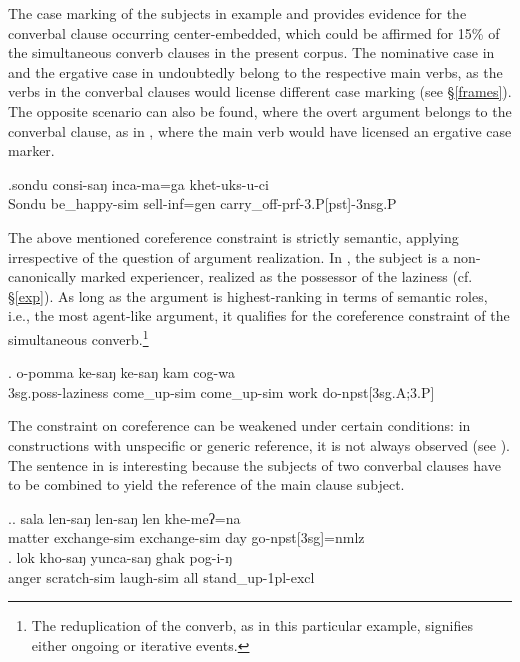 The case marking of the subjects in example \Last[a] and \Last[c] provides evidence for the converbal clause occurring center-embedded, which could be affirmed for 15\% of the simultaneous converb clauses in the present corpus. The nominative case in \Last[a] and the ergative case in  \Last[c] undoubtedly belong to the respective  main verbs, as the verbs in the converbal clauses would license different case marking (see §\ref{frames}). The opposite scenario can also be found, where the overt argument belongs to the converbal clause, as in  \Next, where the main verb would have licensed an ergative case marker.  

\exg.sondu  consi-saŋ  inca-ma=ga    khet-uks-u-ci\\
Sondu   be\_happy{\sc -sim} sell{\sc -inf=gen} carry\_off{\sc -prf-3.P[pst]-3nsg.P}\\
 


The above mentioned coreference constraint is strictly semantic, applying irrespective of the question of argument realization. In \Next, the subject is a non-canonically marked experiencer, realized as the possessor of the laziness (cf. §\ref{exp}). As long as the argument is highest-ranking in terms of semantic roles, i.e., the  most agent-like argument, it qualifies for the coreference constraint of the simultaneous converb.\footnote{The reduplication of the converb, as in this particular example, signifies either ongoing or iterative events.}

\exg.	o-pomma ke-saŋ ke-saŋ kam cog-wa\\
	{\sc 3sg.poss-}laziness come\_up-{\sc sim} come\_up-{\sc sim} work do{\sc -npst[3sg.A;3.P]}\\
		
The constraint on coreference can be weakened under certain conditions: in constructions with unspecific or generic reference, it is not always observed (see \Next[a]). The sentence in \Next[b] is interesting because the subjects of two converbal clauses have to be combined to yield the reference of the main clause subject. 

\ex.\ag.	sala len-saŋ len-saŋ len khe-meʔ=na\\
		matter exchange-{\sc sim} exchange-{\sc sim} day   go{\sc -npst[3sg]=nmlz}\\
		\bg.  lok kho-saŋ                 yunca-saŋ              ghak pog-i-ŋ\\
		anger scratch{\sc -sim} laugh{\sc -sim} all stand\_up{\sc -1pl-excl}\\
		 
		

